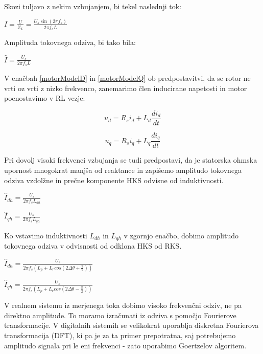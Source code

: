\documentclass[a4paper,twoside,openright,12pt,slovene]{book}
\begin{document}
Skozi tuljavo z nekim vzbujanjem, bi tekel naslednji tok:

\begin{center}
    $I = \frac{U}{Z_L} = \frac{U_s \sin{(2\pi f_s)}}{2\pi f_sL}$
\end{center}

Amplituda tokovnega odziva, bi tako bila:

\begin{center}
    $\hat{I} = \frac{U_s}{2\pi f_sL}$
\end{center}

V enačbah \ref{motorModelD} in \ref{motorModelQ} ob predpostavitvi, da se rotor ne vrti oz vrti z nizko frekvenco, zanemarimo člen inducirane napetosti in motor poenostavimo v RL vezje:

\begin{equation} \label{motorModelD}
    u_d = R_si_d+L_d\frac{di_d}{dt}
\end{equation}

\begin{equation} \label{motorModelQ}
    u_q = R_si_q+L_q\frac{di_q}{dt}
\end{equation}

Pri dovolj visoki frekvenci vzbujanja se tudi predpostavi, da je statorska ohmska upornost mnogokrat manjša od reaktance in zapišemo amplitudo tokovnega odziva vzdolžne in prečne komponente HKS
odvisne od induktivnosti.

\begin{center}
    $\hat{I}_{dh} = \frac{U_s}{2\pi f_sL_{dh}}$
\end{center}

\begin{center}
    $\hat{I}_{qh} = \frac{U_s}{2\pi f_sL_{qh}}$
\end{center}

Ko vstavimo induktivnosti $L_{dh}$ in $L_{qh}$ v zgornjo enačbo, dobimo amplitudo tokovnega odziva v odvisnosti od odklona HKS od RKS.
\begin{center}
    $\hat{I}_{dh} = \frac{U_s}{2\pi f_s (L_p + L_r cos(2\Delta\theta + \frac{\pi}{2}))}$
\end{center}

\begin{center}
    $\hat{I}_{qh} = \frac{U_s}{2\pi f_s (L_p + L_r cos(2\Delta\theta - \frac{\pi}{2}))}$
\end{center}

V realnem sistemu iz merjenega toka dobimo visoko frekvenčni odziv, ne pa direktno amplitude. To moramo izračunati iz odziva s pomočjo Fourierove transformacije. V digitalnih sistemih se velikokrat
uporablja diskretna Fourierova transformacija (DFT), ki pa je za ta primer prepotratna, saj potrebujemo amplitudo signala pri le eni frekvenci - zato uporabimo Goertzelov algoritem.
\end{document}
